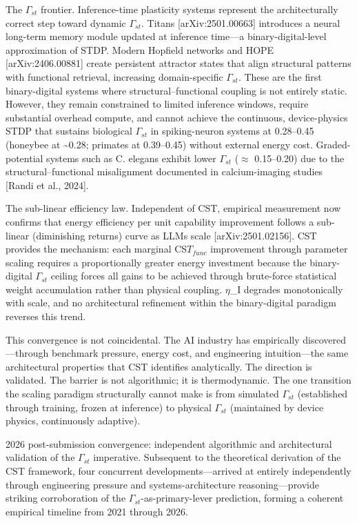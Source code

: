 \documentclass[a4paper,12pt]{article}
\begin{document}
The $\Gamma_{st}$ frontier.
Inference-time plasticity systems represent the architecturally correct step toward dynamic $\Gamma_{st}$.
Titans [arXiv:2501.00663] introduces a neural long-term memory module updated at inference time---a binary-digital-level approximation of STDP.
Modern Hopfield networks and HOPE [arXiv:2406.00881] create persistent attractor states that align structural patterns with functional retrieval, increasing domain-specific $\Gamma_{st}$.
These are the first binary-digital systems where structural--functional coupling is not entirely static.
However, they remain constrained to limited inference windows, require substantial overhead compute, and cannot achieve the continuous, device-physics STDP that sustains biological $\Gamma_{st}$ in spiking-neuron systems at 0.28--0.45 (honeybee at \textasciitilde{}0.28; primates at 0.39--0.45) without external energy cost.
Graded-potential systems such as C. elegans exhibit lower $\Gamma_{st}$ ($\approx$ 0.15--0.20) due to the structural--functional misalignment documented in calcium-imaging studies [Randi et al., 2024].


The sub-linear efficiency law.
Independent of CST, empirical measurement now confirms that energy efficiency per unit capability improvement follows a sub-linear (diminishing returns) curve as LLMs scale [arXiv:2501.02156].
CST provides the mechanism: each marginal CS$T_{func}$ improvement through parameter scaling requires a proportionally greater energy investment because the binary-digital $\Gamma_{st}$ ceiling forces all gains to be achieved through brute-force statistical weight accumulation rather than physical coupling. $\eta$_I degrades monotonically with scale, and no architectural refinement within the binary-digital paradigm reverses this trend.


This convergence is not coincidental.
The AI industry has empirically discovered---through benchmark pressure, energy cost, and engineering intuition---the same architectural properties that CST identifies analytically.
The direction is validated.
The barrier is not algorithmic; it is thermodynamic.
The one transition the scaling paradigm structurally cannot make is from simulated $\Gamma_{st}$ (established through training, frozen at inference) to physical $\Gamma_{st}$ (maintained by device physics, continuously adaptive).


2026 post-submission convergence: independent algorithmic and architectural validation of the $\Gamma_{st}$ imperative. Subsequent to the theoretical derivation of the CST framework, four concurrent developments---arrived at entirely independently through engineering pressure and systems-architecture reasoning---provide striking corroboration of the $\Gamma_{st}$-as-primary-lever prediction, forming a coherent empirical timeline from 2021 through 2026.
\end{document}
